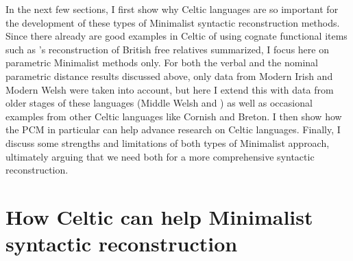 \documentclass[output=paper,colorlinks,citecolor=brown]{langscibook}
\begin{document}
In the next few sections, I first show why Celtic languages are so important for the development of these types of Minimalist syntactic reconstruction methods.  Since there already are good examples in Celtic of using cognate functional items such as \citet{mm:willis_reconstructing_2011}'s reconstruction of British free relatives summarized, I focus here on parametric Minimalist methods only. For both the verbal and the nominal parametric distance results discussed above, only data from Modern Irish and Modern Welsh were taken into account, but here I extend this with data from older stages of these languages (Middle Welsh and ) as well as occasional examples from other Celtic languages like Cornish and Breton. I then show how the PCM in particular can help advance research on Celtic languages. Finally, I discuss some strengths and limitations of both types of Minimalist approach, ultimately arguing that we need both for a more comprehensive syntactic reconstruction.

\section{How Celtic can help Minimalist syntactic reconstruction}
\end{document}
